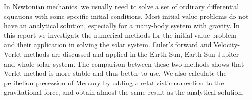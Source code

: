 In Newtonian mechanics, we usually need to solve a set of ordinary differential equations with some specific initial conditions. 
Most initial value problems do not have an analytical solution, especially for a many-body system with gravity. 
In this report we investigate the numerical methods for the initial value problem and their application in solving the solar system. 
Euler's forward and Velocity-Verlet methods are discussed and applied in the Earth-Sun, Earth-Sun-Jupiter and whole solar system. 
The comparison between these two methods shows that Verlet method is more stable and thus better to use. 
We also calculate the perihelion precession of Mercury by adding a relativistic correction to the gravitational force, 
and obtain almost the same result as the analytical solution. 